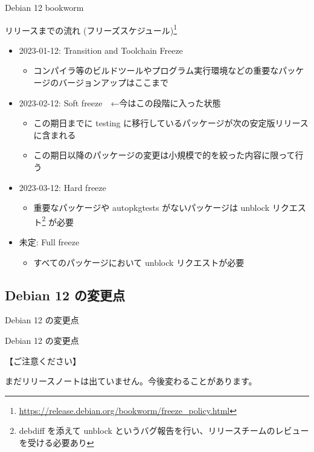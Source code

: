 \begin{frame}{Debian 12 bookworm}%

リリースまでの流れ (フリーズスケジュール)\footnote{\url{https://release.debian.org/bookworm/freeze_policy.html}}

\begin{itemize}
\item 2023-01-12: Transition and Toolchain Freeze
  \begin{itemize}
  \item コンパイラ等のビルドツールやプログラム実行環境などの重要なパッケージのバージョンアップはここまで
  \end{itemize}
\item 2023-02-12: Soft freeze　←今はこの段階に入った状態
  \begin{itemize}
  \item この期日までに testing に移行しているパッケージが次の安定版リリースに含まれる
  \item この期日以降のパッケージの変更は小規模で的を絞った内容に限って行う
  \end{itemize}
\item 2023-03-12: Hard freeze
  \begin{itemize}
  \item 重要なパッケージや autopkgtests がないパッケージは unblock リクエスト\footnote{debdiff を添えて unblock というバグ報告を行い、リリースチームのレビューを受ける必要あり} が必要
  \end{itemize}
\item 未定: Full freeze
  \begin{itemize}
  \item すべてのパッケージにおいて unblock リクエストが必要
  \end{itemize}
\end{itemize}
\end{frame}


\subsection{Debian 12 の変更点}

\begin{frame}
  \begin{center}\Huge{Debian 12 の変更点}\end{center}
\end{frame}


\begin{frame}{Debian 12 の変更点}%

【ご注意ください】

まだリリースノートは出ていません。今後変わることがあります。

\end{frame}

